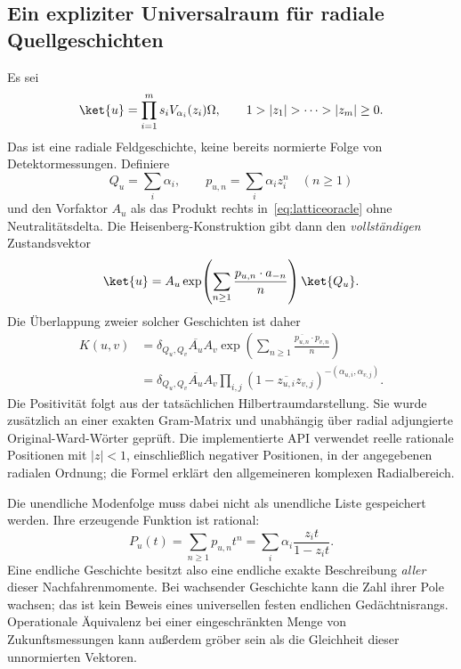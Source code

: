 \subsection{Ein expliziter Universalraum für radiale Quellgeschichten}
Es sei
\begin{equation}
\ket{u}=\prod_{i=1}^m s_iV_{\alpha_i}(z_i)\Omega,
\qquad1>|z_1|>\cdots>|z_m|\ge0.
\end{equation}
Das ist eine radiale Feldgeschichte, keine bereits normierte Folge von Detektormessungen. Definiere
\begin{equation}
Q_u=\sum_i\alpha_i,\qquad p_{u,n}=\sum_i\alpha_i z_i^n\quad(n\ge1)
\end{equation}
und den Vorfaktor $A_u$ als das Produkt rechts in~\eqref{eq:latticeoracle} ohne Neutralitätsdelta. Die Heisenberg-Konstruktion gibt dann den \emph{vollständigen} Zustandsvektor
\begin{equation}\label{eq:fullhistory}
\ket{u}=A_u\exp\!\left(\sum_{n\ge1}\frac{p_{u,n}\cdot a_{-n}}{n}\right)\ket{Q_u}.
\end{equation}
Die Überlappung zweier solcher Geschichten ist daher
\begin{align}\label{eq:historyexact}
K(u,v)&=\delta_{Q_u,Q_v}\overline{A_u}A_v
\exp\!\left(\sum_{n\ge1}\frac{\overline{p_{u,n}}\cdot p_{v,n}}{n}\right)\nonumber\\
&=\delta_{Q_u,Q_v}\overline{A_u}A_v
\prod_{i,j}(1-\overline{z_{u,i}}z_{v,j})^{-(\alpha_{u,i},\alpha_{v,j})}.
\end{align}
Die Positivität folgt aus der tatsächlichen Hilbertraumdarstellung. Sie wurde zusätzlich an einer exakten Gram-Matrix und unabhängig über radial adjungierte Original-Ward-Wörter geprüft. Die implementierte API verwendet reelle rationale Positionen mit $|z|<1$, einschließlich negativer Positionen, in der angegebenen radialen Ordnung; die Formel erklärt den allgemeineren komplexen Radialbereich.


Die unendliche Modenfolge muss dabei nicht als unendliche Liste gespeichert werden. Ihre erzeugende Funktion ist rational:
\begin{equation}\label{eq:momentmemory}
P_u(t)=\sum_{n\ge1}p_{u,n}t^n
=\sum_i\alpha_i\frac{z_i t}{1-z_i t}.
\end{equation}
Eine endliche Geschichte besitzt also eine endliche exakte Beschreibung \emph{aller} dieser Nachfahrenmomente. Bei wachsender Geschichte kann die Zahl ihrer Pole wachsen; das ist kein Beweis eines universellen festen endlichen Gedächtnisrangs. Operationale Äquivalenz bei einer eingeschränkten Menge von Zukunftsmessungen kann außerdem gröber sein als die Gleichheit dieser unnormierten Vektoren.

